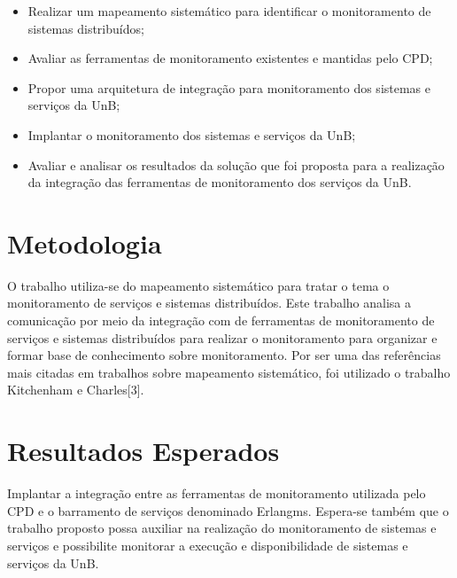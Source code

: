 \begin{itemize}
	 
\item Realizar um mapeamento sistemático para identificar o monitoramento
de sistemas distribuídos;

\item Avaliar as ferramentas de monitoramento existentes e mantidas pelo \acrshort{CPD};

\item Propor uma arquitetura de integração para monitoramento dos sistemas e serviços da \acrshort{UnB};

\item Implantar o monitoramento dos sistemas e serviços da \acrshort{UnB};

\item Avaliar e analisar os resultados da solução que foi proposta para a realização da integração das ferramentas de monitoramento dos serviços da \acrshort{UnB}. 

\end{itemize}

\section{Metodologia}

O trabalho utiliza-se do mapeamento sistemático para tratar o tema o monitoramento de serviços e sistemas distribuídos. Este trabalho analisa a comunicação por meio da integração com de ferramentas de monitoramento de serviços e sistemas distribuídos para realizar o monitoramento para organizar e formar base de conhecimento sobre monitoramento. Por ser uma das referências mais citadas em trabalhos sobre mapeamento sistemático, foi utilizado o trabalho Kitchenham e Charles[3].


\section{Resultados Esperados}

Implantar a integração entre as ferramentas de monitoramento utilizada pelo \acrshort{CPD} e o barramento de serviços denominado Erlangms\cite{Agilar}. Espera-se também que o trabalho proposto possa auxiliar na realização do monitoramento de sistemas e serviços e possibilite monitorar a execução e disponibilidade de sistemas e serviços da \acrshort{UnB}.

